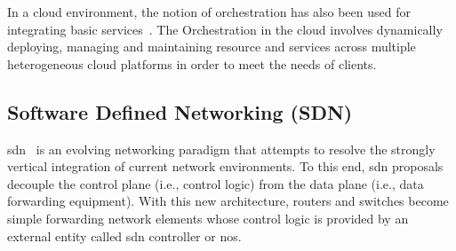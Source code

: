 
In a cloud environment, the notion of orchestration has also been used for integrating basic services~\cite{Vouk2008CloudImplementations}. The Orchestration in the cloud involves dynamically deploying, managing and maintaining resource and services across multiple heterogeneous cloud platforms in order to meet the needs of clients. 



\subsection{Software Defined Networking (SDN)}


\gls{sdn}~\cite{surveySDN} is an evolving networking paradigm that attempts to resolve the strongly vertical integration of current network environments. To this end, \gls{sdn} proposals decouple the control plane (i.e., control logic) from the data plane (i.e., data forwarding equipment). With this new architecture, routers and switches become simple forwarding network elements whose control logic is provided by an external entity called \gls{sdn} controller or \gls{nos}. 

